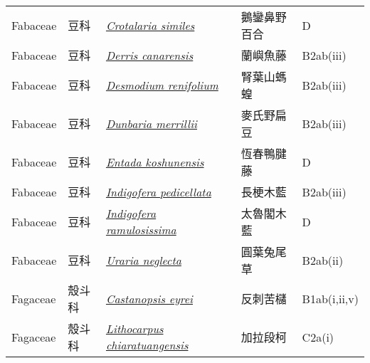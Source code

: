 {\begin{longtable}{p{2.5cm}p{2.5cm}p{4.5cm}p{2.5cm}p{3cm}}
    Fabaceae & 豆科 & \href{http://www.theplantlist.org/tpl1.1/search?q=Crotalaria+similes}{\textit{Crotalaria similes} } & 鵝鑾鼻野百合 & D \index{Crotalaria@\textit{Crotalaria}!similes@\textit{similes}}  \index{鵝鑾鼻野百合} \\
    Fabaceae & 豆科 & \href{http://www.theplantlist.org/tpl1.1/search?q=Derris+canarensis}{\textit{Derris canarensis} } & 蘭嶼魚藤 & B2ab(iii) \index{Derris@\textit{Derris}!canarensis@\textit{canarensis}}  \index{蘭嶼魚藤} \\
    Fabaceae & 豆科 & \href{http://www.theplantlist.org/tpl1.1/search?q=Desmodium+renifolium}{\textit{Desmodium renifolium} } & 腎葉山螞蝗 & B2ab(iii) \index{Desmodium@\textit{Desmodium}!renifolium@\textit{renifolium}}  \index{腎葉山螞蝗} \\
    Fabaceae & 豆科 & \href{http://www.theplantlist.org/tpl1.1/search?q=Dunbaria+merrillii}{\textit{Dunbaria merrillii} } & 麥氏野扁豆 & B2ab(iii) \index{Dunbaria@\textit{Dunbaria}!merrillii@\textit{merrillii}}  \index{麥氏野扁豆} \\
    Fabaceae & 豆科 & \href{http://www.theplantlist.org/tpl1.1/search?q=Entada+koshunensis}{\textit{Entada koshunensis} } & 恆春鴨腱藤 & D \index{Entada@\textit{Entada}!koshunensis@\textit{koshunensis}}  \index{恆春鴨腱藤} \\
    Fabaceae & 豆科 & \href{http://www.theplantlist.org/tpl1.1/search?q=Indigofera+pedicellata}{\textit{Indigofera pedicellata} } & 長梗木藍 & B2ab(iii) \index{Indigofera@\textit{Indigofera}!pedicellata@\textit{pedicellata}}  \index{長梗木藍} \\
    Fabaceae & 豆科 & \href{http://www.theplantlist.org/tpl1.1/search?q=Indigofera+ramulosissima}{\textit{Indigofera ramulosissima} } & 太魯閣木藍 & D \index{Indigofera@\textit{Indigofera}!ramulosissima@\textit{ramulosissima}}  \index{太魯閣木藍} \\
    Fabaceae & 豆科 & \href{http://www.theplantlist.org/tpl1.1/search?q=Uraria+neglecta}{\textit{Uraria neglecta} } & 圓葉兔尾草 & B2ab(ii) \index{Uraria@\textit{Uraria}!neglecta@\textit{neglecta}}  \index{圓葉兔尾草} \\
    Fagaceae & 殼斗科 & \href{http://www.theplantlist.org/tpl1.1/search?q=Castanopsis+eyrei}{\textit{Castanopsis eyrei} } & 反刺苦櫧 & B1ab(i,ii,v) \index{Castanopsis@\textit{Castanopsis}!eyrei@\textit{eyrei}}  \index{反刺苦櫧} \\
    Fagaceae & 殼斗科 & \href{http://www.theplantlist.org/tpl1.1/search?q=Lithocarpus+chiaratuangensis}{\textit{Lithocarpus chiaratuangensis} } & 加拉段柯 & C2a(i) \index{Lithocarpus@\textit{Lithocarpus}!chiaratuangensis@\textit{chiaratuangensis}}  \index{加拉段柯} \\

\end{longtable}}
